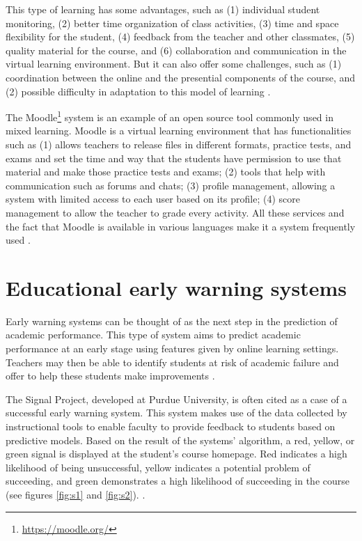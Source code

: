 This type of learning has some advantages, such as (1) individual student monitoring, (2) better time organization of class activities, (3) time and space flexibility for the student, (4) feedback from the teacher and other classmates, (5) quality material for the course, and (6) collaboration and communication in the virtual learning environment. But it can also offer some challenges, such as (1) coordination between the online and the presential components of the course, and (2) possible difficulty in adaptation to this model of learning \cite{nunes2016learning}.

The Moodle\footnote[1]{\hspace{1mm}\url{https://moodle.org/}} system is an example of an open source tool commonly used in mixed learning. Moodle is a virtual learning environment that has functionalities such as (1) allows teachers to release files in different formats, practice tests, and exams and set the time and way that the students have permission to use that material and make those practice tests and exams; (2) tools that help with communication such as forums and chats; (3) profile management, allowing a system with limited access to each user based on its profile; (4) score management to allow the teacher to grade every activity. All these services and the fact that Moodle is available in various languages make it a system frequently used \cite{lopes2007ambientes}.

\section{Educational early warning systems}

Early warning systems can be thought of as the next step in the prediction of academic performance. This type of system aims to predict academic performance at an early stage using features given by online learning settings. Teachers may then be able to identify students at risk of academic failure and offer to help these students make improvements \cite{akccapinar2019using}.

The Signal Project, developed at Purdue University, is often cited as a case of a successful early warning system. This system makes use of the data collected by instructional tools to enable faculty to provide feedback to students based on predictive models. Based on the result of the systems' algorithm, a red, yellow, or green signal is displayed at the student’s course homepage. Red indicates a high likelihood of being unsuccessful, yellow indicates a potential problem of succeeding, and green demonstrates a high likelihood of succeeding in the course (see figures \ref{fig:s1} and \ref{fig:s2}). \cite{arnold2012course}.

